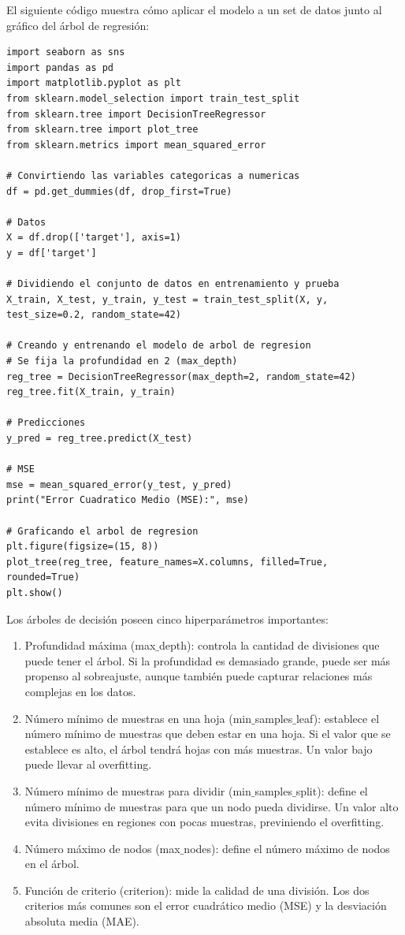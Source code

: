 \documentclass[a4paper, 12pt]{book}
\begin{document}
El siguiente código muestra cómo aplicar el modelo a un set de datos junto al gráfico del árbol de regresión:
\begin{verbatim}
import seaborn as sns
import pandas as pd
import matplotlib.pyplot as plt
from sklearn.model_selection import train_test_split
from sklearn.tree import DecisionTreeRegressor
from sklearn.tree import plot_tree
from sklearn.metrics import mean_squared_error

# Convirtiendo las variables categoricas a numericas
df = pd.get_dummies(df, drop_first=True)

# Datos
X = df.drop(['target'], axis=1)
y = df['target']

# Dividiendo el conjunto de datos en entrenamiento y prueba
X_train, X_test, y_train, y_test = train_test_split(X, y, test_size=0.2, random_state=42)

# Creando y entrenando el modelo de arbol de regresion
# Se fija la profundidad en 2 (max_depth)
reg_tree = DecisionTreeRegressor(max_depth=2, random_state=42)
reg_tree.fit(X_train, y_train)

# Predicciones
y_pred = reg_tree.predict(X_test)

# MSE
mse = mean_squared_error(y_test, y_pred)
print("Error Cuadratico Medio (MSE):", mse)

# Graficando el arbol de regresion
plt.figure(figsize=(15, 8))
plot_tree(reg_tree, feature_names=X.columns, filled=True, rounded=True)
plt.show()
\end{verbatim}
Los árboles de decisión poseen cinco hiperparámetros importantes:
\begin{enumerate}
	\item Profundidad máxima (max$\_$depth): controla la cantidad de divisiones que puede tener el árbol. Si la profundidad es demasiado grande, puede ser más propenso al sobreajuste, aunque también puede capturar relaciones más complejas en los datos.
	\item Número mínimo de muestras en una hoja (min$\_$samples$\_$leaf): establece el número mínimo de muestras que deben estar en una hoja. Si el valor que se establece es alto, el árbol tendrá hojas con más muestras. Un valor bajo puede llevar al overfitting.
	\item Número mínimo de muestras para dividir (min$\_$samples$\_$split): define el número mínimo de muestras para que un nodo pueda dividirse. Un valor alto evita divisiones en regiones con pocas muestras, previniendo el overfitting.
	\item Número máximo de nodos (max$\_$nodes): define el número máximo de nodos en el árbol.
	\item Función de criterio (criterion): mide la calidad de una división. Los dos criterios más comunes son el error cuadrático medio (MSE) y la desviación absoluta media (MAE).
\end{enumerate}
\end{document}
